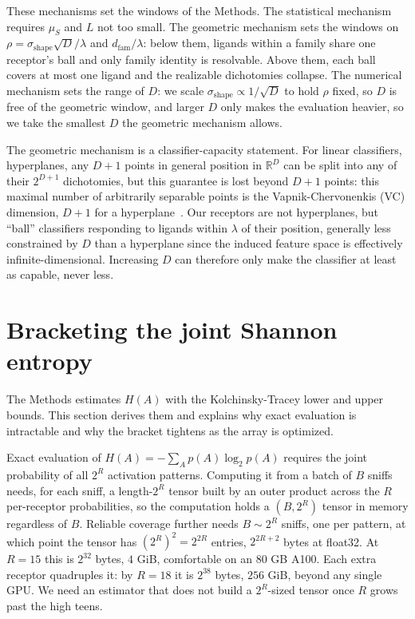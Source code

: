 \documentclass[aps,pre,superscriptaddress,floatfix,longbibliography,linenumbers]{revtex4-2}
\begin{document}
These mechanisms set the windows of the Methods. The statistical mechanism
requires $\mu_S$ and $L$ not too small. The geometric mechanism sets the
windows on $\rho=\sigma_\text{shape}\sqrt D/\lambda$ and $d_\text{fam}/\lambda$:
below them, ligands within a family share one receptor's ball and only family
identity is resolvable. Above them, each ball covers at most one ligand and
the realizable dichotomies collapse. The numerical mechanism sets the range
of $D$: we scale $\sigma_\text{shape}\propto1/\sqrt D$ to hold $\rho$ fixed,
so $D$ is free of the geometric window, and larger $D$ only makes the
evaluation heavier, so we take the smallest $D$ the geometric mechanism
allows.

The geometric mechanism is a classifier-capacity statement. For linear
classifiers, hyperplanes, any $D+1$ points in general position in
$\mathbb{R}^D$ can be split into any of their $2^{D+1}$ dichotomies, but this
guarantee is lost beyond $D+1$ points: this maximal number of arbitrarily
separable points is the Vapnik-Chervonenkis (VC) dimension, $D+1$ for a
hyperplane~\cite{cover_geometrical_1965}. Our receptors are not hyperplanes,
but ``ball'' classifiers responding to ligands within $\lambda$ of their
position, generally less constrained by $D$ than a hyperplane since the
induced feature space is effectively infinite-dimensional. Increasing $D$ can
therefore only make the classifier at least as capable, never less.

\section{Bracketing the joint Shannon entropy}
\label{sec:entropy}

The Methods estimates $H(A)$ with the Kolchinsky-Tracey lower and upper
bounds. This section derives them and explains why exact evaluation is
intractable and why the bracket tightens as the array is optimized.

Exact evaluation of $H(A) = -\sum_A p(A)\log_2 p(A)$ requires the joint
probability of all $2^R$ activation patterns. Computing it from a batch of
$B$ sniffs needs, for each sniff, a length-$2^R$ tensor built by an outer
product across the $R$ per-receptor probabilities, so the computation holds a
$(B,2^R)$ tensor in memory regardless of $B$. Reliable coverage further needs
$B\sim2^R$ sniffs, one per pattern, at which point the tensor has
$(2^R)^2=2^{2R}$ entries, $2^{2R+2}$ bytes at float32. At $R=15$ this is
$2^{32}$ bytes, $4$ GiB, comfortable on an 80 GB A100. Each extra receptor
quadruples it: by $R=18$ it is $2^{38}$ bytes, $256$ GiB, beyond any single
GPU. We need an estimator that does not build a $2^R$-sized tensor once $R$
grows past the high teens.
\end{document}
